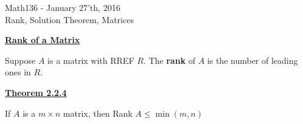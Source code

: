 \documentclass{letter}
\newcommand{\0}[1]{\begin{bmatrix}#1\end{bmatrix}}
\newcommand{\h}[1]{\underline{\textbf{#1}}}
\begin{document}
	\begin{center}
		\LARGE Math136 - January 27'th, 2016\\
		\large Rank, Solution Theorem, Matrices
	\end{center}
	\vspace{0.25 in}
	
	\h{Rank of a Matrix}
	
	Suppose $A$ is a matrix with RREF $R$. The \textbf{rank} of $A$ is the number of leading ones in $R$.
	
	\h{Theorem 2.2.4}
	
	If $A$ is a $m\times n$ matrix, then Rank $A \leq \min(m, n)$
\end{document}
